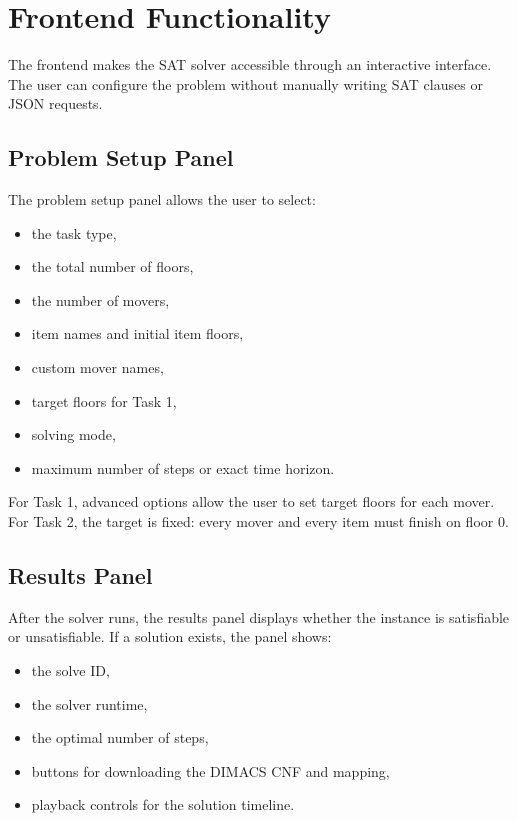 \section{Frontend Functionality} \label{sec:frontend-functionality}
The frontend makes the SAT solver accessible through an interactive interface.
The user can configure the problem without manually writing SAT clauses or JSON requests.

\subsection{Problem Setup Panel} \label{subsec:problem-setup-panel}

The problem setup panel allows the user to select:

\begin{itemize}
    \item the task type,
    \item the total number of floors,
    \item the number of movers,
    \item item names and initial item floors,
    \item custom mover names,
    \item target floors for Task 1,
    \item solving mode,
    \item maximum number of steps or exact time horizon.
\end{itemize}

\noindent For Task 1, advanced options allow the user to set target floors for each mover.
For Task 2, the target is fixed: every mover and every item must finish on floor $0$.

\subsection{Results Panel} \label{subsec:results-panel}

After the solver runs, the results panel displays whether the instance is satisfiable or unsatisfiable.
If a solution exists, the panel shows:

\begin{itemize}
    \item the solve ID,
    \item the solver runtime,
    \item the optimal number of steps,
    \item buttons for downloading the DIMACS CNF and mapping,
    \item playback controls for the solution timeline.
\end{itemize}

